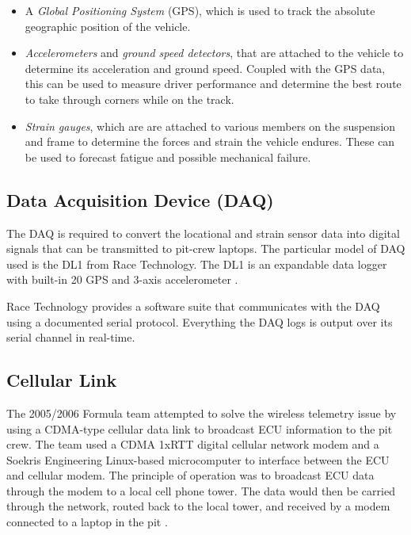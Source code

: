 \begin{itemize}

\item A \emph{Global Positioning System} (GPS), which is used to track the absolute geographic position of the vehicle. 

\item \emph{Accelerometers} and \emph{ground speed detectors}, that are attached to the vehicle to determine its acceleration and ground speed. Coupled with the GPS data, this can be used to measure driver performance and determine the best route to take through corners while on the track.

\item \emph{Strain gauges}, which are are attached to various members on the suspension and frame to determine the forces and strain the vehicle endures. These can be used to forecast fatigue and possible mechanical failure. 

\end{itemize}

\subsection{Data Acquisition Device (DAQ)}

The DAQ is required to convert the locational and strain sensor data into digital signals that can be transmitted to pit-crew laptops. The particular model of DAQ used is the DL1 from Race Technology. The DL1 is an expandable data logger with built-in \unit{20}{\hertz} GPS and 3-axis accelerometer \cite{DL1Dsheet}.

Race Technology provides a software suite that communicates with the DAQ using a documented serial protocol. Everything the DAQ logs is output over its serial channel in real-time.

\subsection{Cellular Link}

The 2005/2006 Formula team attempted to solve the wireless telemetry issue by using a CDMA-type cellular data link to broadcast ECU information to the pit crew. The team used a CDMA 1xRTT digital cellular network modem and a Soekris Engineering Linux-based microcomputer to interface between the ECU and cellular modem. The principle of operation was to broadcast ECU data through the modem to a local cell phone tower. The data would then be carried through the network, routed back to the local tower, and received by a modem connected to a laptop in the pit \cite{G26FinalRepo}.


